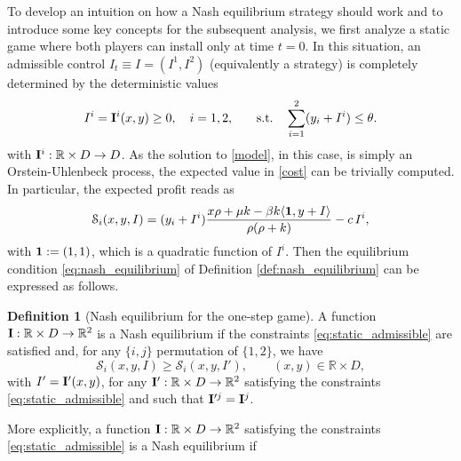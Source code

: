 \documentclass[10pt]{article}
\numberwithin{equation}{section}
\theoremstyle{plain}
\numberwithin{theorem}{section}
\theoremstyle{definition}
\newtheorem{definition}[theorem]{Definition}
\def \R {\mathbb{R}}
\newcommand{\<}{\langle}
\renewcommand{\>}{\rangle}
\renewcommand{\(}{\left(}
\renewcommand{\)}{\right)}
\def \R  {{\mathbb {R}}}
\def \R {{\mathbb {R}}}
\begin{document}
{{To develop an intuition on how a Nash equilibrium strategy should work and to introduce some key concepts for the subsequent analysis, we first analyze {a static game} where both players can install only at time $t=0$. In this situation, an admissible control {$I_t \equiv I=(I^1,I^2)$} (equivalently a strategy) %
is completely determined by the deterministic values 
\begin{equation}\label{eq:static_admissible}
I^i={\bf I}^i(x,y)\ge 0, \quad {i=1,2,}\qquad \text{s.t.}\quad \sum_{i=1}^2 (y_i+I^i)\leq \theta.
\end{equation} 
with ${\bf I}^i : \mathbb{R} \times D \to D$. 
{As the solution to \eqref{model}, in this case, is simply an Orstein-Uhlenbeck process, the expected value in \eqref{cost} can be trivially computed. In particular, the expected profit reads as} 
\begin{equation}\label{eq:profit_onestep}
\mathcal{S}_i(x,y,I)=(y_i+I^i)\frac{x\rho+\mu k-\beta k \langle {\bf 1}, y+I \rangle}{\rho (\rho+k)}-c\, I^i,
\end{equation}
with ${\bf 1} := (1,1)$, 
which is a quadratic function of $I^i$. Then the equilibrium condition \eqref{eq:nash_equilibrium} of Definition \ref{def:nash_equilibrium} can be  expressed as follows. 
{\begin{definition}[Nash equilibrium for the one-step game]
A function ${\bf I}:\R\times D \to \R^2$ is a Nash equilibrium if %
the constraints \eqref{eq:static_admissible} are satisfied and, for any $\{i,j\}$ permutation of $\{1,2 \}$, we have
\begin{equation}%
\mathcal{S}_i(x,y,I) \geq \mathcal{S}_i(x,y,I'), \qquad (x,y)\in\R\times D,
\end{equation}
with $I' = {\bf I}'(x,y)$, for any ${\bf I}':\R\times D \to \R^2$ satisfying the constraints \eqref{eq:static_admissible} and such that ${\bf I}'^j={\bf I}^j$.
\end{definition}
More explicitly, a function ${\bf I}:\R\times D \to \R^2$ satisfying the constraints \eqref{eq:static_admissible} is a Nash equilibrium if
}}}
\end{document}
